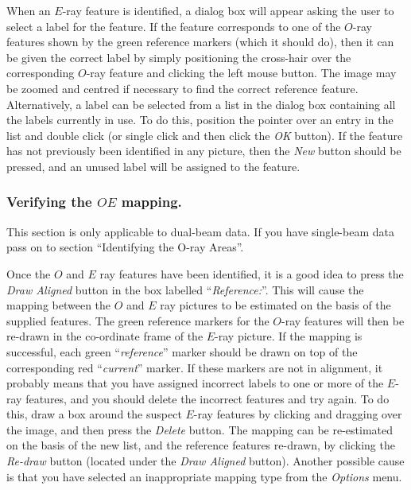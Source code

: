 \documentclass[11pt]{article}
\newcommand{\htmlref}[2]{#1}
\begin{document}
When an $E$-ray feature is identified, a \htmlref{dialog
box}{POLKA_GET_LABEL} will appear asking the user to select a label for
the feature. If the feature corresponds to one of the $O$-ray features
shown by the green reference markers (which it should do), then it can be
given the correct label by simply positioning the cross-hair over the
corresponding $O$-ray feature and clicking the left mouse button. The
image may be zoomed and centred if necessary to find the correct
reference feature. Alternatively, a label can be selected from a list in
the dialog box containing all the labels currently in use. To do this,
position the pointer over an entry in the list and double click (or
single click and then click the \emph{OK} button). If the feature has not
previously been identified in any picture, then the \emph{New} button
should be pressed, and an unused label will be assigned to the feature.

\subsubsection {Verifying the $OE$ mapping.}
This section is only applicable to dual-beam data. If you have
single-beam data pass on to section ``\htmlref{Identifying the O-ray Areas}
{TUT_O_RAY_AREAS}''.

Once the $O$ and $E$ ray features have been identified, it is a good idea
to press the \htmlref{\emph{Draw Aligned}}{POLKA_DRAW_ALIGNED} button in
the box labelled ``\htmlref{\emph{Reference:}}{POLKA_REFERENCE}''. This
will cause the mapping between the $O$ and $E$ ray pictures to be
estimated on the basis of the supplied features. The green reference
markers for the $O$-ray features will then be re-drawn in the co-ordinate
frame of the $E$-ray picture. If the mapping is successful, each green
``\emph{reference}'' marker should be drawn on top of the corresponding
red ``\emph{current}'' marker. If these markers are not in alignment, it
probably means that you have assigned incorrect labels to one or more of
the $E$-ray features, and you should delete the incorrect features and
try again. To do this, draw a box around the suspect $E$-ray features by
clicking and dragging over the image, and then press the \htmlref{{\em
Delete}}{POLKA_DELETE} button. The mapping can be re-estimated on the
basis of the new list, and the reference features re-drawn, by clicking
the \htmlref{\emph{Re-draw}}{POLKA_REDRAW} button (located under the {\em
Draw Aligned} button). Another possible cause is that you have selected
an inappropriate mapping type from the \htmlref{{\em
Options}}{POLKA_OPTIONS_MENU} menu.
\end{document}
